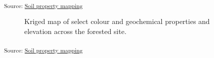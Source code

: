 \documentclass[
  number]{elsarticle}
\begin{document}
\textsubscript{Source:
\href{https://alex-koiter.github.io/spatial-variability-soil-manuscript/notebooks/property_maps.qmd.html\#cell-fig-ag_map}{Soil
property mapping}}

\begin{figure}[H]


\caption{\label{fig-forest_map}Kriged map of select colour and
geochemical properties and elevation across the forested site.}

\end{figure}%

\textsubscript{Source:
\href{https://alex-koiter.github.io/spatial-variability-soil-manuscript/notebooks/property_maps.qmd.html\#cell-fig-forest_map}{Soil
property mapping}}
\end{document}
